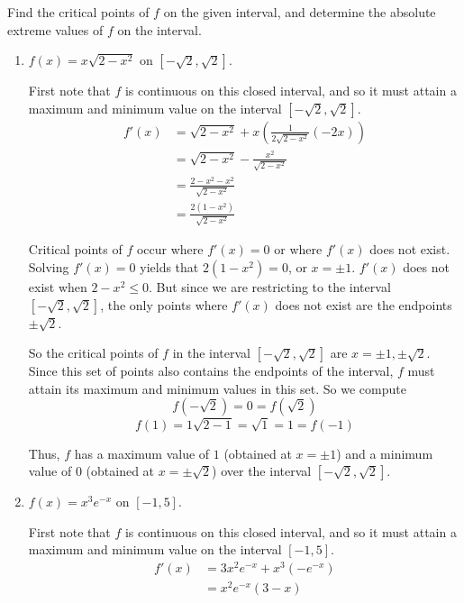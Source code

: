 \documentclass[nooutcomes]{ximera}
\begin{document}
\begin{problem}
Find the critical points of $f$ on the given interval, and determine the absolute extreme values of $f$ on the interval.
		\begin{enumerate}
		
			\item  $f(x) = x \sqrt{2-x^2}$ on $[-\sqrt{2}, \sqrt{2}]$.
				
				\begin{freeResponse}
				First note that $f$ is continuous on this closed interval, and so it must attain a maximum and minimum value on the interval $[-\sqrt{2}, \sqrt{2}]$.
				\begin{align*}
				f'(x) &= \sqrt{2-x^2} + x \left( \frac{1}{2 \sqrt{2-x^2}} (-2x) \right) \\
				&= \sqrt{2-x^2} - \frac{x^2}{\sqrt{2-x^2}} \\
				&= \frac{2-x^2-x^2}{\sqrt{2-x^2}} \\
				&= \frac{2(1-x^2)}{\sqrt{2-x^2}}
				\end{align*}
				
				Critical points of $f$ occur where $f'(x) = 0$ or where $f'(x)$ does not exist.  Solving $f'(x) = 0$ yields that $2(1-x^2) = 0$, or $x = \pm 1$.  $f'(x)$ does not exist when $2-x^2 \leq 0$.  But since we are restricting to the interval $[-\sqrt{2}, \sqrt{2}]$, the only points where $f'(x)$ does not exist are the endpoints $\pm \sqrt{2}$.  
				
				So the critical points of $f$ in the interval $[-\sqrt{2}, \sqrt{2}]$ are $x = \pm 1, \pm \sqrt{2}$.  Since this set of points also contains the endpoints of the interval, $f$ must attain its maximum and minimum values in this set.  So we compute
				$$ f(-\sqrt{2}) = 0 = f(\sqrt{2}) $$
				$$ f(1) = 1 \sqrt{2-1} = \sqrt{1} = 1 = f(-1) $$
				
				Thus, $f$ has a maximum value of $1$ (obtained at $x=\pm 1$) and a minimum value of 0 (obtained at $x=\pm \sqrt{2}$) over the interval $[-\sqrt{2}, \sqrt{2}]$.
				\end{freeResponse}
				
				
				
			\item  $f(x) = x^3 e^{-x}$ on $[-1,5]$.
			
				\begin{freeResponse}
				First note that $f$ is continuous on this closed interval, and so it must attain a maximum and minimum value on the interval $[-1,5]$.
				\begin{align*}
				f'(x) &= 3x^2 e^{-x} + x^3(-e^{-x}) \\
				&= x^2 e^{-x} (3-x)
				\end{align*}
				

\end{freeResponse}
\end{enumerate}
\end{problem}
\end{document}
